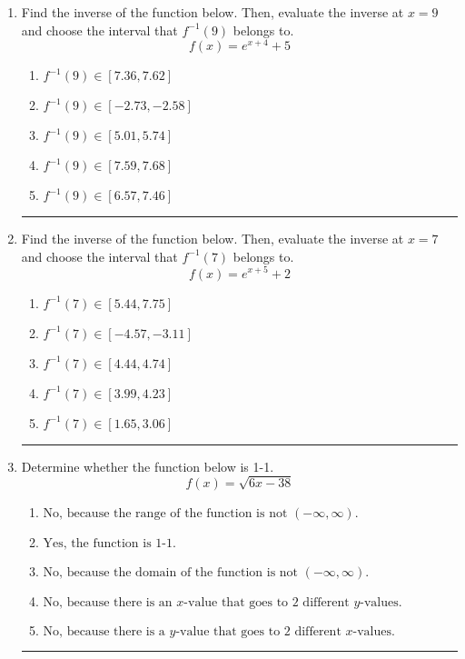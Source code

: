 \documentclass[14pt]{extbook}
\newcommand{\litem}[1]{\item#1\hspace*{-1cm}\rule{\textwidth}{0.4pt}}
\begin{document}
\begin{enumerate}
{\begin{enumerate}[label=\Alph*.]
\end{enumerate} }
\litem{
Find the inverse of the function below. Then, evaluate the inverse at $x = 9$ and choose the interval that $f^{-1}(9)$ belongs to.\[ f(x) = e^{x+4}+5 \]\begin{enumerate}[label=\Alph*.]
\item \( f^{-1}(9) \in [7.36, 7.62] \)
\item \( f^{-1}(9) \in [-2.73, -2.58] \)
\item \( f^{-1}(9) \in [5.01, 5.74] \)
\item \( f^{-1}(9) \in [7.59, 7.68] \)
\item \( f^{-1}(9) \in [6.57, 7.46] \)

\end{enumerate} }
\litem{
Find the inverse of the function below. Then, evaluate the inverse at $x = 7$ and choose the interval that $f^{-1}(7)$ belongs to.\[ f(x) = e^{x+5}+2 \]\begin{enumerate}[label=\Alph*.]
\item \( f^{-1}(7) \in [5.44, 7.75] \)
\item \( f^{-1}(7) \in [-4.57, -3.11] \)
\item \( f^{-1}(7) \in [4.44, 4.74] \)
\item \( f^{-1}(7) \in [3.99, 4.23] \)
\item \( f^{-1}(7) \in [1.65, 3.06] \)

\end{enumerate} }
\litem{
Determine whether the function below is 1-1.\[ f(x) = \sqrt{6 x - 38} \]\begin{enumerate}[label=\Alph*.]
\item \( \text{No, because the range of the function is not $(-\infty, \infty)$.} \)
\item \( \text{Yes, the function is 1-1.} \)
\item \( \text{No, because the domain of the function is not $(-\infty, \infty)$.} \)
\item \( \text{No, because there is an $x$-value that goes to 2 different $y$-values.} \)
\item \( \text{No, because there is a $y$-value that goes to 2 different $x$-values.} \)


\end{enumerate}}
\end{enumerate}
\end{document}
